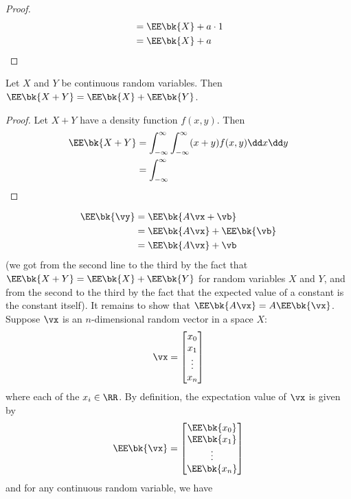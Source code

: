 \documentclass[189]{pset}
\begin{document}
\begin{enumerate}
\begin{proof}
\begin{align*}
            &= \EE\bk{X} + a\cdot 1 \\
            &= \EE\bk{X} + a
          \end{align*}
        \end{proof}
        \begin{lemma}
          Let $X$ and $Y$ be continuous random variables. Then
          $\EE\bk{X+Y} = \EE\bk{X}+\EE\bk{Y}$.
        \end{lemma}
        \begin{proof}
          Let $X+Y$ have a density function $f(x,y)$. Then
          \begin{align*}
            \EE\bk{X+Y}
            &= \int_{-\infty}^\infty \int_{-\infty}^\infty
              (x+y)f(x,y)\dd x \dd y \\
            &= \int_{-\infty}^\infty
          \end{align*}
        \end{proof}
        \begin{align*}
          \EE\bk{\vy}
          &= \EE\bk{A\vx + \vb} \\
          &= \EE\bk{A\vx} + \EE\bk{\vb} \\
          &= \EE\bk{A\vx} + \vb
        \end{align*}
        (we got from the second line to the third by the fact that
        $\EE\bk{X + Y} = \EE\bk{X} + \EE\bk{Y}$ for random variables
        $X$ and $Y$, and from the second to the third by the fact that
        the expected value of a constant is the constant itself). It
        remains to show that $\EE\bk{A\vx} = A\EE\bk{\vx}$. Suppose
        $\vx$ is an $n$-dimensional random vector in a space $X$:
        \[
          \vx =
          \begin{bmatrix}
            x_0 \\
            x_1 \\
            \vdots \\
            x_n
          \end{bmatrix}
        \]
        where each of the $x_i \in \RR$. By definition, the
        expectation value of $\vx$ is given by
        \[
          \EE\bk{\vx} =
          \begin{bmatrix}
            \EE\bk{x_0} \\
            \EE\bk{x_1} \\
            \vdots \\
            \EE\bk{x_n}
          \end{bmatrix}
        \]
        and for any continuous random variable, we have

\end{enumerate}
\end{document}
